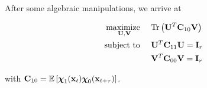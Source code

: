 \documentclass[aspectratio=169, usenames, dvipsnames]{beamer}
\renewcommand{\trace}[1]{\text{Tr}\left( #1 \right)}
\DeclareMathOperator*{\maximize}{maximize~}
\DeclareMathOperator{\subto}{subject~to~}
\begin{document}
\begin{frame}
  \vfill

  After some algebraic manipulations, we arrive at

  \vfill
  
  {
    \Large
    \[
      \begin{aligned}
        \maximize_{\vb{U}, \vb{V}} & \quad \trace{ \vb{U}^T \vb{C}_{10} \vb{V} } \\
        \subto & \quad \vb{U}^T \vb{C}_{11} \vb{U} = \vb{I}_r \\
               & \quad \vb{V}^T \vb{C}_{00} \vb{V} = \vb{I}_r
      \end{aligned}
    \]
  }

  \vfill

  with $\vb{C}_{10} = \mathbb{E} \left[ \boldsymbol{\chi}_1(\vb{x}_t) \boldsymbol{\chi}_0(\vb{x}_{t+\tau}) \right]$.
  \vfill
\end{frame}
\end{document}
